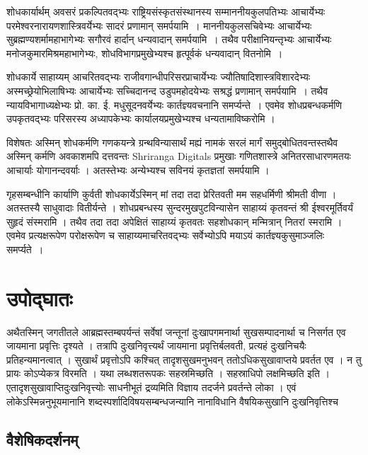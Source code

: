 शोधकार्यार्थम् अवसरं प्रकल्पितवद्भ्यः राष्ट्रियसंस्कृतसंस्थानस्य सम्माननीयकुलपतिभ्यः आचार्येभ्यः परमेश्वरनारायणशास्त्रिवर्येभ्यः सादरं प्रणामान् समर्पयामि~। माननीयकुलसचिवेभ्यः आचार्येभ्यः सुब्रह्मण्यशर्मामहाभागेभ्यः सगौरवं हार्दान् धन्यवादान् समर्पयामि~। तथैव परीक्षानियन्तृभ्यः आचार्येभ्यः मनोजकुमारमिश्रमहाभागेभ्यः, शोधविभागप्रमुखेभ्यश्च  हृत्पूर्वकं धन्यवादान् वितनोमि~।

शोधकार्ये साहाय्यम् आचरितवद्भ्यः राजीवगान्धीपरिसरप्राचार्येभ्यः ज्यौतिषादिशास्त्रविशारदेभ्यः अस्मच्छ्रेयोभिलाषिभ्यः आचार्येभ्यः सच्चिदानन्द उडुपमहोदयेभ्यः सश्रद्धं प्रणामान् समर्पयामि~। तथैव न्यायविभागाध्यक्षेभ्यः प्रो. का. ई. मधुसूदनवर्येभ्यः  कार्तज्ञ्यवचनानि समर्प्यन्ते~। एवमेव शोधप्रबन्धकर्मणि उपकृतवद्भ्यः परिसरस्य अध्यापकेभ्यः कार्यालयप्रमुखेभ्यश्च धन्यतामाविष्करोमि ।

विशेषतः अस्मिन् शोधकर्मणि गणकयन्त्रे ग्रन्थविन्यासार्थं मह्यं \Latex नामकं सरलं मार्गं समुद्बोधितवन्तस्तथैव अस्मिन् कर्मणि अवकाशमपि दत्तवन्तः Shriranga Digitals प्रमुखाः गणितशास्त्रे अनितरसाधारणमतयः आचार्याः योगानन्दवर्याः । अतस्तेभ्यः अन्येभ्यश्च सविनयं कृतज्ञतां समर्पयामि । 

गृहसम्बन्धीनि कार्याणि कुर्वती शोधकार्येऽस्मिन् मां तदा तदा प्रेरितवती मम सहधर्मिणी श्रीमती वीणा । अतस्तस्यै साधुवादाः वितीर्यन्ते । शोधप्रबन्धस्य सुन्दरमुखपुटविन्यासेन साहाय्यं कृतवन्तं श्री ईश्वरमूर्तिवर्यं सुहृदं संस्मरामि । तथैव तदा तदा अपेक्षितं साहाय्यं कृतवतः सहशोधकान् मन्मित्रान् नितरां स्मरामि । एवमेव प्रत्यक्षरूपेण परोक्षरूपेण च साहाय्यमाचरितवद्भ्यः सर्वेभ्योऽपि मयाऽयं कार्तज्ञ्यकुसुमाञ्जलिः समर्प्यते~।






\chapter{उपोद्घातः}



अथैतस्मिन् जगतीतले आब्रह्मस्तम्बपर्यन्तं सर्वेषां जन्तूनां दुःखापगमनार्था सुखसम्पादनार्था च निसर्गत एव जायमाना प्रवृत्तिः दृश्यते । तत्रापि दुःखनिवृत्त्यर्थं जायमाना प्रवृत्तिर्बलवती,  प्रत्यहं दुःखनिचयैः प्रतिहन्यमानत्वात् । सुखार्थं प्रवृत्तोऽपि कश्चित् तादृशसुखमनुभवन् ततोऽधिकसुखावाप्तये प्रवर्तत एव । न तु प्रायः कोऽप्येकत्र विरमति । यथा लब्धशतरूपकः‌ सहस्रमिच्छति । सहस्राधिपो लक्षमिच्छति इति ।  एतादृशसुखावाप्तिदुःखनिवृत्त्योः साधनीभूतं द्रव्यमिति विज्ञाय तदर्जने प्रवर्तन्ते लोका । एवं लोकेऽस्मिन्ननुभूयमानानि शब्दस्पर्शादिविषयसम्बन्धजन्यानि  नानाविधानि वैषयिकसुखानि दुःखनिवृत्तिश्च 

\section{वैशेषिकदर्शनम्}

